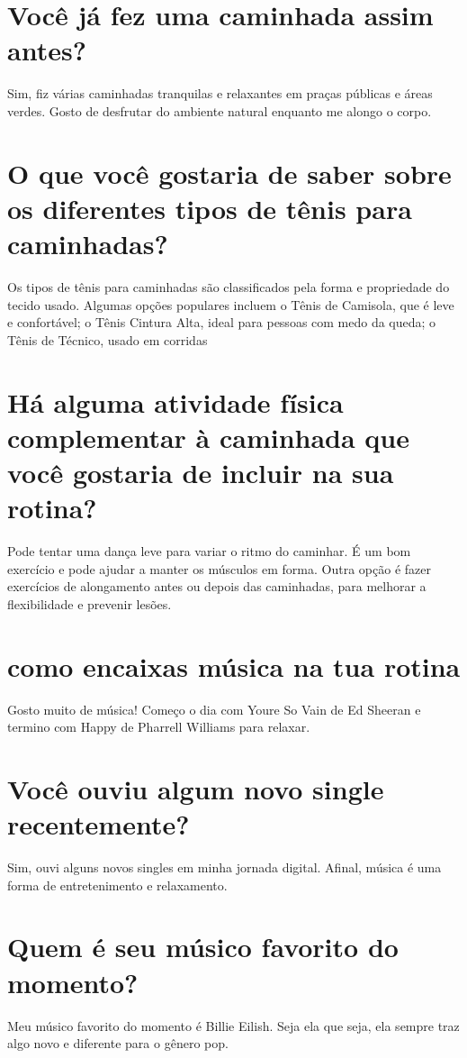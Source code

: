 \documentclass[11pt,a4paper]{article}
\begin{document}
\section{Você já fez uma caminhada assim antes?}
Sim, fiz várias caminhadas tranquilas e relaxantes em praças públicas e áreas verdes. Gosto de desfrutar do ambiente natural enquanto me alongo o corpo.

\section{O que você gostaria de saber sobre os diferentes tipos de tênis para caminhadas?}
Os tipos de tênis para caminhadas são classificados pela forma e propriedade do tecido usado. Algumas opções populares incluem o Tênis de Camisola, que é leve e confortável; o Tênis Cintura Alta, ideal para pessoas com medo da queda; o Tênis de Técnico, usado em corridas

\section{Há alguma atividade física complementar à caminhada que você gostaria de incluir na sua rotina?}
Pode tentar uma dança leve para variar o ritmo do caminhar. É um bom exercício e pode ajudar a manter os músculos em forma. Outra opção é fazer exercícios de alongamento antes ou depois das caminhadas, para melhorar a flexibilidade e prevenir lesões.

\section{como encaixas música na tua rotina}
Gosto muito de música! Começo o dia com Youre So Vain de Ed Sheeran e termino com Happy de Pharrell Williams para relaxar.

\section{Você ouviu algum novo single recentemente?}
Sim, ouvi alguns novos singles em minha jornada digital. Afinal, música é uma forma de entretenimento e relaxamento.

\section{Quem é seu músico favorito do momento?}
Meu músico favorito do momento é Billie Eilish. Seja ela que seja, ela sempre traz algo novo e diferente para o gênero pop.
\end{document}
